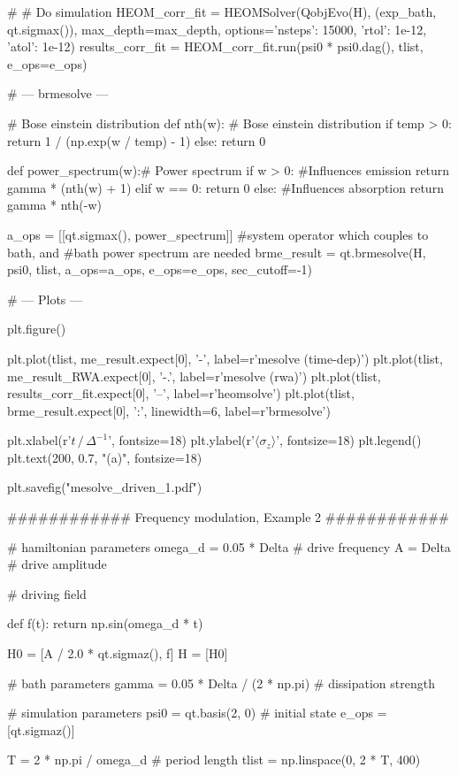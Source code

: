 # # Do simulation
HEOM_corr_fit = HEOMSolver(QobjEvo(H), (exp_bath, qt.sigmax()), max_depth=max_depth,
                    options={'nsteps': 15000, 'rtol': 1e-12, 'atol': 1e-12})
results_corr_fit = HEOM_corr_fit.run(psi0 * psi0.dag(), tlist, e_ops=e_ops)

# --- brmesolve ---

# Bose einstein distribution
def nth(w): # Bose einstein distribution
    if temp > 0:
        return 1 / (np.exp(w / temp) - 1)
    else:
        return 0

def power_spectrum(w):# Power spectrum
    if w > 0: #Influences emission
        return gamma * (nth(w) + 1)
    elif w == 0:
        return 0
    else: #Influences absorption
        return gamma * nth(-w)

a_ops = [[qt.sigmax(), power_spectrum]] #system operator which couples to bath, and 
                                        #bath power spectrum are needed
brme_result = qt.brmesolve(H, psi0, tlist, a_ops=a_ops, e_ops=e_ops, sec_cutoff=-1)


# --- Plots ---

plt.figure()

plt.plot(tlist, me_result.expect[0], '-', label=r'mesolve (time-dep)')
plt.plot(tlist, me_result_RWA.expect[0], '-.', label=r'mesolve (rwa)')
plt.plot(tlist, results_corr_fit.expect[0], '--', label=r'heomsolve')
plt.plot(tlist, brme_result.expect[0], ':', linewidth=6, label=r'brmesolve')

plt.xlabel(r'$t\, /\, \Delta^{-1}$', fontsize=18)
plt.ylabel(r'$\langle \sigma_z \rangle$', fontsize=18)
plt.legend()
plt.text(200, 0.7, "(a)", fontsize=18)

plt.savefig("mesolve_driven_1.pdf")


############ Frequency modulation, Example 2 ############

# hamiltonian parameters
omega_d = 0.05 * Delta  # drive frequency
A = Delta  # drive amplitude

# driving field


def f(t):
    return np.sin(omega_d * t)


H0 = [A / 2.0 * qt.sigmaz(), f]
H = [H0]

# bath parameters
gamma = 0.05 * Delta / (2 * np.pi)  # dissipation strength

# simulation parameters
psi0 = qt.basis(2, 0)  # initial state
e_ops = [qt.sigmaz()]

T = 2 * np.pi / omega_d  # period length
tlist = np.linspace(0, 2 * T, 400)

